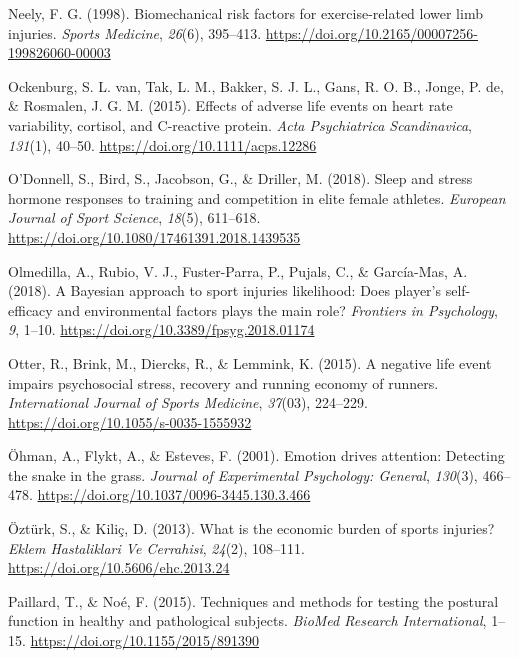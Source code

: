 \documentclass[
  english,
  man,floatsintext]{apa6}
\begin{document}
\leavevmode\hypertarget{ref-Neely1998}{}%
Neely, F. G. (1998). Biomechanical risk factors for exercise-related lower limb injuries. \emph{Sports Medicine}, \emph{26}(6), 395--413. \url{https://doi.org/10.2165/00007256-199826060-00003}

\leavevmode\hypertarget{ref-VanOckenburg2015a}{}%
Ockenburg, S. L. van, Tak, L. M., Bakker, S. J. L., Gans, R. O. B., Jonge, P. de, \& Rosmalen, J. G. M. (2015). Effects of adverse life events on heart rate variability, cortisol, and C-reactive protein. \emph{Acta Psychiatrica Scandinavica}, \emph{131}(1), 40--50. \url{https://doi.org/10.1111/acps.12286}

\leavevmode\hypertarget{ref-ODonnell2018a}{}%
O'Donnell, S., Bird, S., Jacobson, G., \& Driller, M. (2018). Sleep and stress hormone responses to training and competition in elite female athletes. \emph{European Journal of Sport Science}, \emph{18}(5), 611--618. \url{https://doi.org/10.1080/17461391.2018.1439535}

\leavevmode\hypertarget{ref-Olmedilla2018}{}%
Olmedilla, A., Rubio, V. J., Fuster-Parra, P., Pujals, C., \& García-Mas, A. (2018). A Bayesian approach to sport injuries likelihood: Does player's self-efficacy and environmental factors plays the main role? \emph{Frontiers in Psychology}, \emph{9}, 1--10. \url{https://doi.org/10.3389/fpsyg.2018.01174}

\leavevmode\hypertarget{ref-Otter2015}{}%
Otter, R., Brink, M., Diercks, R., \& Lemmink, K. (2015). A negative life event impairs psychosocial stress, recovery and running economy of runners. \emph{International Journal of Sports Medicine}, \emph{37}(03), 224--229. \url{https://doi.org/10.1055/s-0035-1555932}

\leavevmode\hypertarget{ref-Ohman2001}{}%
Öhman, A., Flykt, A., \& Esteves, F. (2001). Emotion drives attention: Detecting the snake in the grass. \emph{Journal of Experimental Psychology: General}, \emph{130}(3), 466--478. \url{https://doi.org/10.1037/0096-3445.130.3.466}

\leavevmode\hypertarget{ref-Ozturk2013}{}%
Öztürk, S., \& Kiliç, D. (2013). What is the economic burden of sports injuries? \emph{Eklem Hastaliklari Ve Cerrahisi}, \emph{24}(2), 108--111. \url{https://doi.org/10.5606/ehc.2013.24}

\leavevmode\hypertarget{ref-Paillard2015}{}%
Paillard, T., \& Noé, F. (2015). Techniques and methods for testing the postural function in healthy and pathological subjects. \emph{BioMed Research International}, 1--15. \url{https://doi.org/10.1155/2015/891390}
\end{document}
